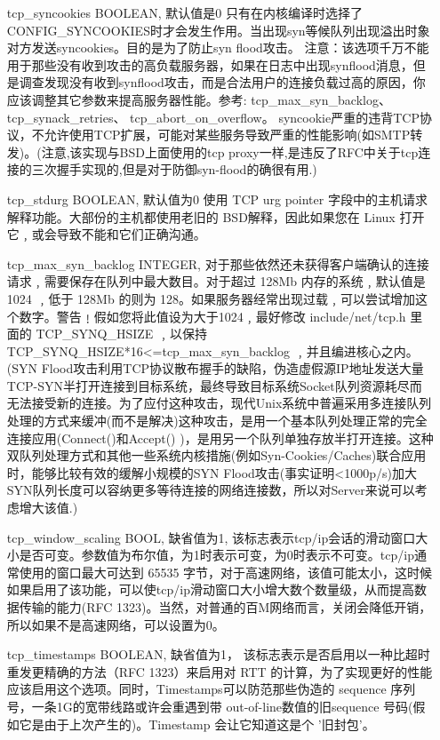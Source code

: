 \begin{enumerate}
\item[tcp\_syncookies] BOOLEAN,
默认值是0
只有在内核编译时选择了CONFIG\_SYNCOOKIES时才会发生作用。当出现syn等候队列出现溢出时象对方发送syncookies。目的是为了防止syn flood攻击。
注意：该选项千万不能用于那些没有收到攻击的高负载服务器，如果在日志中出现synflood消息，但是调查发现没有收到synflood攻击，而是合法用户的连接负载过高的原因，你应该调整其它参数来提高服务器性能。参考:
    tcp\_max\_syn\_backlog、
    tcp\_synack\_retries、
    tcp\_abort\_on\_overflow。
syncookie严重的违背TCP协议，不允许使用TCP扩展，可能对某些服务导致严重的性能影响(如SMTP转发)。(注意,该实现与BSD上面使用的tcp proxy一样,是违反了RFC中关于tcp连接的三次握手实现的,但是对于防御syn-flood的确很有用.)

\item[tcp\_stdurg] BOOLEAN,
默认值为0
使用 TCP urg pointer 字段中的主机请求解释功能。大部份的主机都使用老旧的 BSD解释，因此如果您在 Linux 打开它﹐或会导致不能和它们正确沟通。

\item[tcp\_max\_syn\_backlog] INTEGER,
对于那些依然还未获得客户端确认的连接请求﹐需要保存在队列中最大数目。对于超过 128Mb 内存的系统﹐默认值是1024 ﹐低于 128Mb 的则为 128。如果服务器经常出现过载﹐可以尝试增加这个数字。警告﹗假如您将此值设为大于1024﹐最好修改 include/net/tcp.h 里面的 TCP\_SYNQ\_HSIZE ﹐以保持TCP\_SYNQ\_HSIZE*16<=tcp\_max\_syn\_backlog ﹐并且编进核心之内。(SYN Flood攻击利用TCP协议散布握手的缺陷，伪造虚假源IP地址发送大量TCP-SYN半打开连接到目标系统，最终导致目标系统Socket队列资源耗尽而无法接受新的连接。为了应付这种攻击，现代Unix系统中普遍采用多连接队列处理的方式来缓冲(而不是解决)这种攻击，是用一个基本队列处理正常的完全连接应用(Connect()和Accept() )，是用另一个队列单独存放半打开连接。这种双队列处理方式和其他一些系统内核措施(例如Syn-Cookies/Caches)联合应用时，能够比较有效的缓解小规模的SYN Flood攻击(事实证明<1000p/s)加大SYN队列长度可以容纳更多等待连接的网络连接数，所以对Server来说可以考虑增大该值.)

\item[tcp\_window\_scaling] BOOL,
                            缺省值为1,
                            该标志表示tcp/ip会话的滑动窗口大小是否可变。参数值为布尔值，为1时表示可变，为0时表示不可变。tcp/ip通常使用的窗口最大可达到 65535 字节，对于高速网络，该值可能太小，这时候如果启用了该功能，可以使tcp/ip滑动窗口大小增大数个数量级，从而提高数据传输的能力(RFC 1323)。当然，对普通的百M网络而言，关闭会降低开销，所以如果不是高速网络，可以设置为0。

\item[tcp\_timestamps] BOOLEAN,
                        缺省值为1，
                        该标志表示是否启用以一种比超时重发更精确的方法（RFC 1323）来启用对 RTT 的计算，为了实现更好的性能应该启用这个选项。同时，Timestamps可以防范那些伪造的 sequence 序列号，一条1G的宽带线路或许会重遇到带 out-of-line数值的旧sequence 号码(假如它是由于上次产生的)。Timestamp 会让它知道这是个 '旧封包'。


\end{enumerate}
